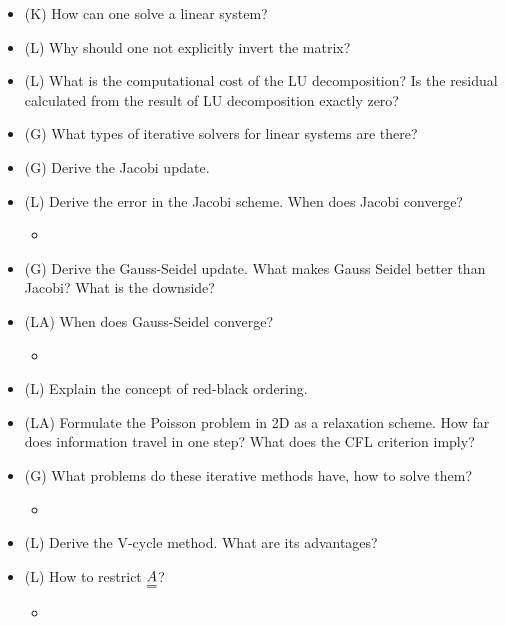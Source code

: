 \begin{itemize}
    \item (K) How can one solve a linear system?
    \item (L) Why should one not explicitly invert the matrix?
    \item (L) What is the computational cost of the LU decomposition? Is the residual calculated from the result of LU decomposition exactly zero?
    \item (G) What types of iterative solvers for linear systems are there?
    \item (G) Derive the Jacobi update.
    \item (L) Derive the error in the Jacobi scheme. When does Jacobi converge?
    \begin{itemize}
        \item {}
    \end{itemize}
    \item (G) Derive the Gauss-Seidel update. What makes Gauss Seidel better than Jacobi? What is the downside?
    \item (LA) When does Gauss-Seidel converge?
    \begin{itemize}
        \item {}
    \end{itemize}
    \item (L) Explain the concept of red-black ordering. 
    \item (LA) Formulate the Poisson problem in 2D as
    a relaxation scheme. How far does information travel in one step? What does the CFL criterion imply?
    \item (G) What problems do these iterative methods have, how to solve them?
    \begin{itemize}
        \item {}
    \end{itemize}
    \item (L) Derive the V-cycle method. What are its advantages?
    \item (L) How to restrict $\mat{A}$?
    \begin{itemize}
        \item {}

\end{itemize}
\end{itemize}
